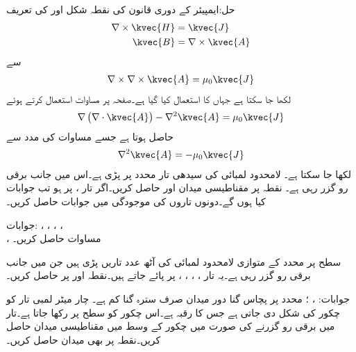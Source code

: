 حل:ایمپیئر کے دوری قانون کی نقطہ شکل اور  کی تعریف
\begin{align*}
\nabla \times \kvec{H}&=\kvec{J}\\
\kvec{B}&=\nabla \times \kvec{A}
\end{align*}
سے
\begin{align*}
\nabla \times \nabla \times \kvec{A}=\mu_0 \kvec{J}
\end{align*}
لکھا جا سکتا ہے جہاں  کا استعمال کیا گیا ہے۔صفحہ  پر مساوات  استعمال کرتے ہوئے
\begin{align*}
\nabla \left(\nabla \cdot \kvec{A} \right)-\nabla^2 \kvec{A}=\mu_0 \kvec{J}
\end{align*}
حاصل ہوتا ہے جسے مساوات  کی مدد سے
\begin{align}
\nabla^2 \kvec{A}=-\mu_0 \kvec{J}
\end{align}
لکھا جا سکتا ہے۔
\newpage
{}
لامحدود لمبائی کی سیدھی تار  محدد پر پڑی ہے۔اس میں  جانب  برقی رو گزر رہی ہے۔ نقطہ  پر مقناطیسی میدان  اور  حاصل کریں۔اگر تار ،  پر ہو تب جوابات کیا ہوں گے۔دونوں تاروں کی موجودگی میں جوابات حاصل کریں۔ 

جوابات: ، ، ، ،\\
 ، 
مساوات  حاصل کریں۔

سطح  پر  محدد کے متوازی لامحدود لمبائی کی آٹھ عدد تاریں پڑی ہیں جن میں  جانب  برقی رو گزر رہی ہے۔یہ تار ، ، ، ،  پر پائے جاتے ہیں۔نقطہ  اور  پر  حاصل کریں۔

جوابات: ، ؛ محدد پر پچاس گنا دور میدان صرف سترہ گنا کم ہے۔
چار میٹر لمبی تار کو چکور کی شکل دی جاتی ہے جس کا رقبہ  ہے۔اس چکور کو  سطح پر رکھا جاتا ہے۔تار میں برقی رو  گزرنے کی صورت میں چکور کے وسط  میں مقناطیسی میدان  حاصل کریں۔نقطہ  پر بھی میدان حاصل کریں۔

